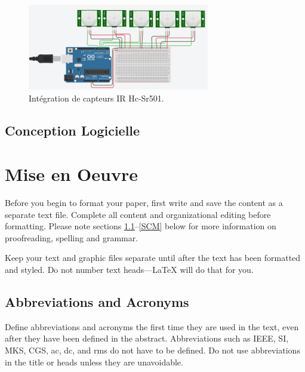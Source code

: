 \documentclass[journal]{IEEEtran}
\begin{document}
\begin{figure}[htbp]
    \centerline{\includegraphics{hardware2.png}}
    \caption{Intégration de capteurs IR Hc-Sr501.\cite{b5}}
    \label{fig2}
\end{figure} 


\subsection{Conception Logicielle}

\section{Mise en Oeuvre}
Before you begin to format your paper, first write and save the content as a 
separate text file. Complete all content and organizational editing before 
formatting. Please note sections \ref{AA}--\ref{SCM} below for more information on 
proofreading, spelling and grammar.

Keep your text and graphic files separate until after the text has been 
formatted and styled. Do not number text heads---{\LaTeX} will do that 
for you.

\subsection{Abbreviations and Acronyms}\label{AA}
Define abbreviations and acronyms the first time they are used in the text, 
even after they have been defined in the abstract. Abbreviations such as 
IEEE, SI, MKS, CGS, ac, dc, and rms do not have to be defined. Do not use 
abbreviations in the title or heads unless they are unavoidable.
\end{document}
